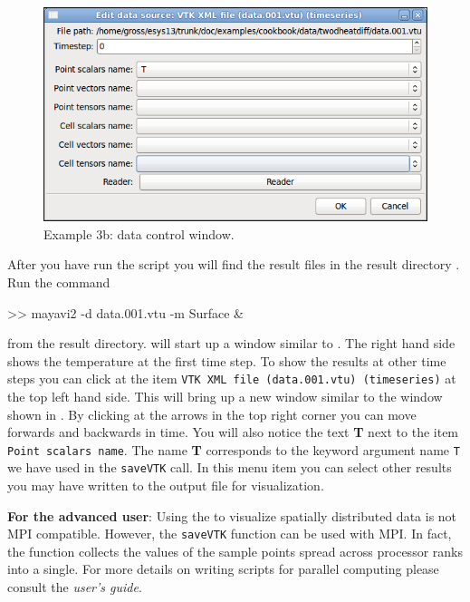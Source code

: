 \begin{figure}[ht]
\centerline{\includegraphics[width=4.in]{figures/ScreeshotMayavi2n2}}
\caption{Example 3b: \mayavi data control window.}
\label{fig:mayavi window2}
\end{figure}
After you have run the script you will find the 
result files  in the result directory . Run the 
command
\begin{python}
>> mayavi2 -d data.001.vtu -m Surface &
\end{python}
from the result directory. \mayavi will start up a window similar to .
The right hand side shows the temperature at the first time step. To show
the results at other time steps you can click at the item \texttt{VTK XML file (data.001.vtu) (timeseries)}
at the top left hand side. This will bring up a new window similar to the window shown in  . By clicking at the arrows in the top right corner you can move forwards and backwards in time. 
You will also notice the text \textbf{T} next to the item \texttt{Point scalars name}. The
name \textbf{T} corresponds to the keyword argument name \texttt{T} we have used 
in the \verb|saveVTK| call. In this menu item you can select other results 
you may have written to the output file for visualization.

\textbf{For the advanced user}: Using the \modmpl to visualize spatially distributed data 
is not MPI compatible. However, the \verb|saveVTK| function can be used with MPI. In fact,
the function collects the values of the sample points spread across processor ranks into a single.
For more details on writing scripts for parallel computing please consult the \emph{user's guide}.